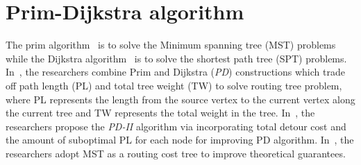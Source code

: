 \section{Prim-Dijkstra algorithm}
The prim algorithm~\cite{prim1957shortest} is to solve the Minimum spanning tree (MST) problems while the Dijkstra algorithm~\cite{dijkstra1959note} is to solve the shortest path tree (SPT) problems.
In~\cite{alpert1993direct}, the researchers combine Prim and Dijkstra (\emph{PD}) constructions which trade off path length (PL) and total tree weight (TW) to solve routing tree problem, where PL represents the length from the source vertex to the current vertex along the current tree and TW represents the total weight in the tree.
In~\cite{alpert2018prim}, the researchers propose the \emph{PD-II} algorithm via incorporating total detour cost and the amount of suboptimal PL for each node for improving PD algorithm.
In~\cite{lin2023improvement}, the researchers adopt MST as a routing cost tree to improve theoretical guarantees.